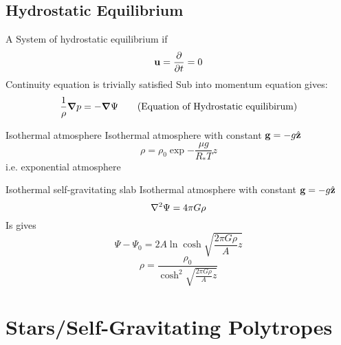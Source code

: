 \documentclass[12pt,a4paper]{article}
\begin{document}
    \subsection{Hydrostatic Equilibrium}
        A System of hydrostatic equilibrium if 
        \begin{equation}
            \vb{u} = \pdv{}{t} =0
        \end{equation}
        Continuity equation is trivially satisfied
        Sub into momentum equation gives:
        \begin{equation}
            \frac{1}{\rho}\grad{p} = - \grad{\Psi}\tag{Equation of Hydrostatic equilibirum}
        \end{equation}
        \begin{example}
            {Isothermal atmosphere}{
                Isothermal atmosphere with constant $\vb{g}=-g\hat{\vb{z}}$
                \begin{equation}
                    \rho = \rho_0 \exp{-\frac{\mu g} {R_{*} T} z}
                \end{equation}
                i.e. exponential atmosphere
            }
        \end{example}
        \begin{example}
            {Isothermal self-gravitating slab}{
                Isothermal atmosphere with constant $\vb{g}=-g\hat{\vb{z}}$
                \begin{equation}
                    \laplacian{\Psi} = 4\pi G\rho
                \end{equation}
                Is gives
                \begin{equation}
                    \Psi-\Psi_0 = 2A\ln{\cosh{\sqrt{\frac{2\pi G\rho}{A}z}}}
                \end{equation}
                \begin{equation}
                    \rho = \frac{\rho_0}{\cosh^2{\sqrt{\frac{2\pi G\rho}{A}z}}}
                \end{equation}
            }
        \end{example}
    \section{Stars/Self-Gravitating Polytropes}
        
\end{document}
